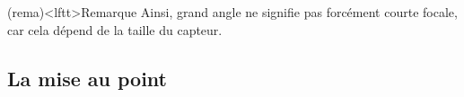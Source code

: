 \documentclass[../../main/main.tex]{subfiles}
\begin{document}
\begin{tcn}(rema)<lftt>{Remarque}
	Ainsi, grand angle ne signifie pas forcément courte focale, car cela dépend de
	la taille du capteur.
\end{tcn}

%
%
%
%
%
%

\subsection{La mise au point}
\end{document}
